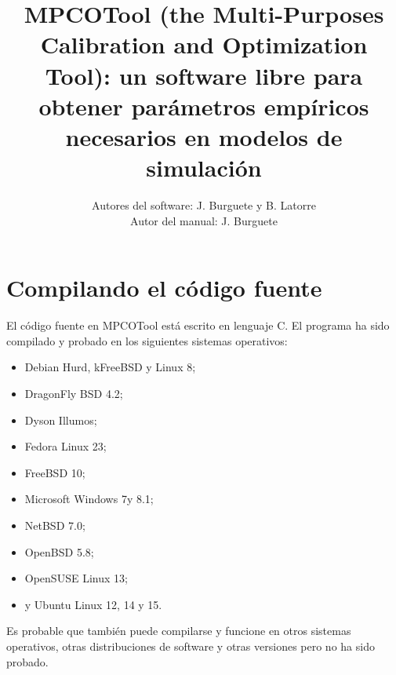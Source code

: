 \documentclass[a4paper]{report}
\begin{document}
\title{MPCOTool (the Multi-Purposes Calibration and Optimization Tool): un
software libre para obtener parámetros empíricos necesarios en modelos de
simulación}

\author{Autores del software: J. Burguete y B. Latorre\\
Autor del manual: J. Burguete}

\maketitle

\tableofcontents

\chapter{Compilando el código fuente}

El código fuente en MPCOTool está escrito en lenguaje C. El programa ha sido
compilado y probado en los siguientes sistemas operativos:
\begin{itemize}
\item Debian Hurd, kFreeBSD y Linux 8;
\item DragonFly BSD 4.2;
\item Dyson Illumos;
\item Fedora Linux 23;
\item FreeBSD 10;
\item Microsoft Windows 7\footnotemark[1] y 8.1\footnotemark[1];
\item NetBSD 7.0;
\item OpenBSD 5.8;
\item OpenSUSE Linux 13;
\item y Ubuntu Linux 12, 14 y 15.
\end{itemize}
Es probable que también puede compilarse y funcione en otros sistemas
operativos, otras distribuciones de software y otras versiones pero no ha sido
probado.
\end{document}
